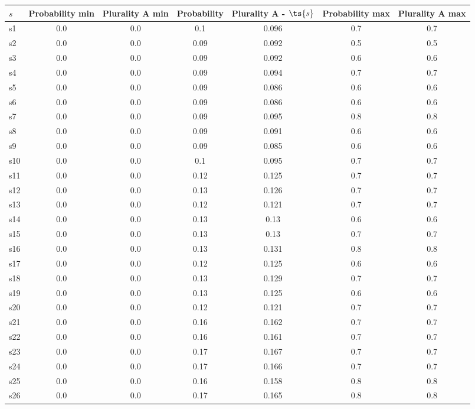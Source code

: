 \documentclass{article}
\begin{document}
\noindent\begin{tabular}{|l|c|c|c|c|c|c|}
\hline
$s$& Probability min & Plurality A min & Probability & Plurality A - $\ts{s}$ & Probability max & Plurality A max\\
\hline
s1 &0.0 & 0.0 & 0.1 & 0.096 & 0.7 & 0.7\\
\hline
s2 &0.0 & 0.0 & 0.09 & 0.092 & 0.5 & 0.5\\
\hline
s3 &0.0 & 0.0 & 0.09 & 0.092 & 0.6 & 0.6\\
\hline
s4 &0.0 & 0.0 & 0.09 & 0.094 & 0.7 & 0.7\\
\hline
s5 &0.0 & 0.0 & 0.09 & 0.086 & 0.6 & 0.6\\
\hline
s6 &0.0 & 0.0 & 0.09 & 0.086 & 0.6 & 0.6\\
\hline
s7 &0.0 & 0.0 & 0.09 & 0.095 & 0.8 & 0.8\\
\hline
s8 &0.0 & 0.0 & 0.09 & 0.091 & 0.6 & 0.6\\
\hline
s9 &0.0 & 0.0 & 0.09 & 0.085 & 0.6 & 0.6\\
\hline
s10 &0.0 & 0.0 & 0.1 & 0.095 & 0.7 & 0.7\\
\hline
s11 &0.0 & 0.0 & 0.12 & 0.125 & 0.7 & 0.7\\
\hline
s12 &0.0 & 0.0 & 0.13 & 0.126 & 0.7 & 0.7\\
\hline
s13 &0.0 & 0.0 & 0.12 & 0.121 & 0.7 & 0.7\\
\hline
s14 &0.0 & 0.0 & 0.13 & 0.13 & 0.6 & 0.6\\
\hline
s15 &0.0 & 0.0 & 0.13 & 0.13 & 0.7 & 0.7\\
\hline
s16 &0.0 & 0.0 & 0.13 & 0.131 & 0.8 & 0.8\\
\hline
s17 &0.0 & 0.0 & 0.12 & 0.125 & 0.6 & 0.6\\
\hline
s18 &0.0 & 0.0 & 0.13 & 0.129 & 0.7 & 0.7\\
\hline
s19 &0.0 & 0.0 & 0.13 & 0.125 & 0.6 & 0.6\\
\hline
s20 &0.0 & 0.0 & 0.12 & 0.121 & 0.7 & 0.7\\
\hline
s21 &0.0 & 0.0 & 0.16 & 0.162 & 0.7 & 0.7\\
\hline
s22 &0.0 & 0.0 & 0.16 & 0.161 & 0.7 & 0.7\\
\hline
s23 &0.0 & 0.0 & 0.17 & 0.167 & 0.7 & 0.7\\
\hline
s24 &0.0 & 0.0 & 0.17 & 0.166 & 0.7 & 0.7\\
\hline
s25 &0.0 & 0.0 & 0.16 & 0.158 & 0.8 & 0.8\\
\hline
s26 &0.0 & 0.0 & 0.17 & 0.165 & 0.8 & 0.8\\
\hline

\end{tabular}
\end{document}
